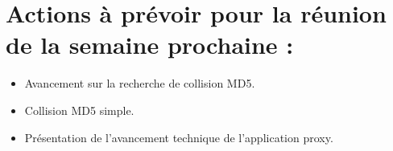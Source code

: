 \documentclass[a4paper,11pt,french]{article}
\begin{document}
\section{Actions à prévoir pour la réunion de la semaine prochaine :}
\begin{itemize}
  \item Avancement sur la recherche de collision MD5.
  \item Collision MD5 simple.
  \item Présentation de l'avancement technique de l'application proxy.
\end{itemize}
\end{document}
